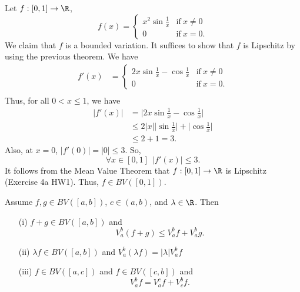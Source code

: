 \begin{eg}
    Let \( f:[0,1] \to \R  \), \[ f(x) = 
    \begin{cases}
        x^{2} \sin \frac{ 1 }{ x }  &\text{if} \ x \neq 0 \\
        0 &\text{if} \ x = 0. 
    \end{cases} \] 
    We claim that \( f \) is a bounded variation. It suffices to show that \( f  \) is Lipschitz by using the previous theorem. We have 
    \begin{align*}
        f'(x) &= 
        \begin{cases}
            2x \sin \frac{ 1 }{ x }  - \cos \frac{ 1 }{ x }  &\text{if} \ x \neq 0 \\
            0 &\text{if} \ x = 0. 
        \end{cases} \\
    \end{align*}
    Thus, for all \( 0 < x \leq 1  \), we have 
    \begin{align*}
       | f'(x) |  &= \Big| 2x \sin \frac{ 1 }{ x }  - \cos \frac{ 1 }{ x }  \Big|    \\
                  &\leq 2 |  x  | \Big| \sin \frac{ 1 }{ x }  \Big|  + \Big| \cos \frac{ 1 }{ x }  \Big| \\
                  &\leq 2 + 1 = 3.
    \end{align*}
    Also, at \( x = 0  \), \( | f'(0) | = | 0  |  \leq 3 \). So, 
    \[  \forall x \in [0,1] \ \ | f'(x) |  \leq 3. \]
    It follows from the Mean Value Theorem that \( f:[0,1] \to \R  \) is Lipschitz (Exercise 4a HW1). Thus, \( f \in BV([0,1]) \).
\end{eg}

\begin{theorem}
    Assume \( f,g \in BV([a,b]) \), \(  c \in (a,b) \), and \( \lambda \in \R  \). Then
    \begin{enumerate}
        \item[(i)] \( f + g \in BV([a,b]) \) and
            \[  {V}_{a}^{b} (f + g) \leq {V}_{a}^{b} f + {V}_{a}^{b} g.  \]
        \item[(ii)] \( \lambda f \in BV([a,b]) \) and \( {V}_{a}^{b}(\lambda f) = | \lambda  |  {V}_{a}^{b} f  \)
        \item[(iii)] \( f \in BV([a,c]) \) and \( f \in BV([c,b])  \) and  
            \[  {V}_{a}^{b} f = {V}_{a}^{c} f + {V}_{c}^{b} f. \]
    \end{enumerate}
\end{theorem}

